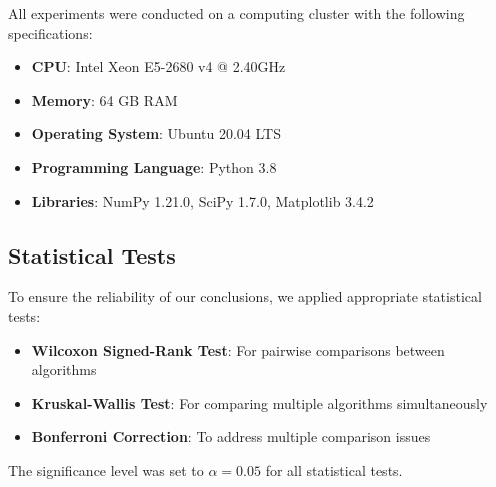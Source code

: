 All experiments were conducted on a computing cluster with the following specifications:
\begin{itemize}
    \item \textbf{CPU}: Intel Xeon E5-2680 v4 @ 2.40GHz
    \item \textbf{Memory}: 64 GB RAM
    \item \textbf{Operating System}: Ubuntu 20.04 LTS
    \item \textbf{Programming Language}: Python 3.8
    \item \textbf{Libraries}: NumPy 1.21.0, SciPy 1.7.0, Matplotlib 3.4.2
\end{itemize}

\subsection{Statistical Tests}

To ensure the reliability of our conclusions, we applied appropriate statistical tests:

\begin{itemize}
    \item \textbf{Wilcoxon Signed-Rank Test}: For pairwise comparisons between algorithms
    \item \textbf{Kruskal-Wallis Test}: For comparing multiple algorithms simultaneously
    \item \textbf{Bonferroni Correction}: To address multiple comparison issues
\end{itemize}

The significance level was set to $\alpha = 0.05$ for all statistical tests.
